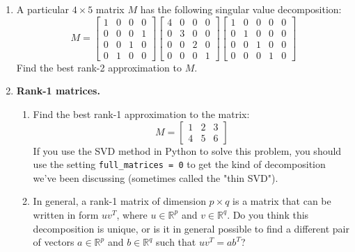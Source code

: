 \documentclass{article}
\begin{document}
\begin{enumerate}[resume]
\item A particular $4 \times 5$ matrix $M$ has the following singular value decomposition:
    \[
    M = \begin{bmatrix}
    1 & 0 & 0 & 0 \\
    0 & 0 & 0 & 1 \\
    0 & 0 & 1 & 0 \\
    0 & 1 & 0 & 0
    \end{bmatrix}
    \begin{bmatrix}
    4 & 0 & 0 & 0 \\
    0 & 3 & 0 & 0 \\
    0 & 0 & 2 & 0 \\
    0 & 0 & 0 & 1
    \end{bmatrix}
    \begin{bmatrix}
    1 & 0 & 0 & 0 & 0 \\
    0 & 1 & 0 & 0 & 0 \\
    0 & 0 & 1 & 0 & 0 \\
    0 & 0 & 0 & 1 & 0
    \end{bmatrix}
    \]
    Find the best rank-2 approximation to $M$.

\item \textbf{Rank-1 matrices.}
    \begin{enumerate}
    \item Find the best rank-1 approximation to the matrix:
        \[
        M = \begin{bmatrix}
        1 & 2 & 3 \\
        4 & 5 & 6
        \end{bmatrix}
        \]
        If you use the SVD method in Python to solve this problem, you should use the setting \texttt{full\_matrices = 0} to get the kind of decomposition we've been discussing (sometimes called the "thin SVD").
    \item In general, a rank-1 matrix of dimension $p \times q$ is a matrix that can be written in form $u v^{T}$, where $u \in \mathbb{R}^{p}$ and $v \in \mathbb{R}^{q}$. Do you think this decomposition is unique, or is it in general possible to find a different pair of vectors $a \in \mathbb{R}^{p}$ and $b \in \mathbb{R}^{q}$ such that $u v^{T} = a b^{T}$?
    \end{enumerate}
\end{enumerate}
\end{document}
